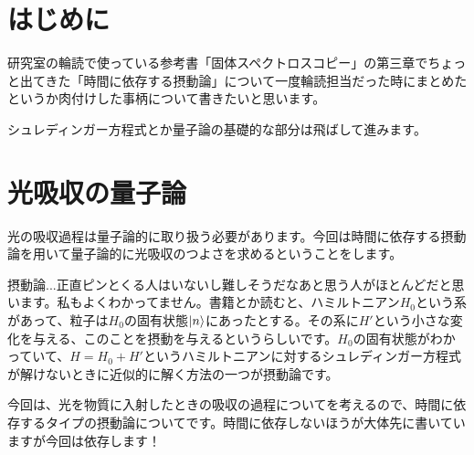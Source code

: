 \documentclass[11pt,b5paper,papersize,dvipdfmx]{jsbook}
\begin{document}


%
\section*{はじめに}
研究室の輪読で使っている参考書「固体スペクトロスコピー」の第三章でちょっと出てきた「時間に依存する摂動論」について一度輪読担当だった時にまとめたというか肉付けした事柄について書きたいと思います。\par
シュレディンガー方程式とか量子論の基礎的な部分は飛ばして進みます。

\section{光吸収の量子論}
光の吸収過程は量子論的に取り扱う必要があります。今回は時間に依存する摂動論を用いて量子論的に光吸収のつよさを求めるということをします。\par
摂動論...正直ピンとくる人はいないし難しそうだなあと思う人がほとんどだと思います。私もよくわかってません。書籍とか読むと、ハミルトニアン$H_0$という系があって、粒子は$H_0$の固有状態$\ket{n}$にあったとする。その系に$H'$という小さな変化を与える、このことを摂動を与えるというらしいです。$H_0$の固有状態がわかっていて、$H = H_0 + H'$というハミルトニアンに対するシュレディンガー方程式が解けないときに近似的に解く方法の一つが摂動論です。\par
今回は、光を物質に入射したときの吸収の過程についてを考えるので、時間に依存するタイプの摂動論についてです。時間に依存しないほうが大体先に書いていますが今回は依存します！
\end{document}
